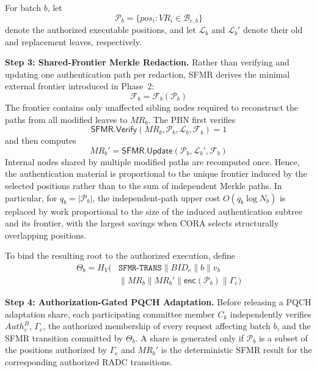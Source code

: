 \documentclass[lettersize,journal]{IEEEtran}
\begin{document}
For batch $b$, let
\begin{equation}
\mathcal{P}_b=
\{pos_i:VR_i\in\mathcal{B}_{e,b}\}
\end{equation}
denote the authorized executable positions, and let
$\mathcal{L}_b$ and $\mathcal{L}_b'$ denote their old and replacement
leaves, respectively.

\medskip
\noindent\textbf{Step 3: Shared-Frontier Merkle Redaction.}
Rather than verifying and updating one authentication path per
redaction, SFMR derives the minimal external frontier introduced in
Phase~2:
\begin{equation}
\mathcal{F}_b
=
\mathcal{F}_b(\mathcal{P}_b)
\end{equation}
The frontier contains only unaffected sibling nodes required to
reconstruct the paths from all modified leaves to $MR_b$. The PBN first
verifies
\begin{equation}
\mathsf{SFMR.Verify}
(MR_b,\mathcal{P}_b,\mathcal{L}_b,\mathcal{F}_b)=1
\end{equation}
and then computes
\begin{equation}
MR_b'
=
\mathsf{SFMR.Update}
(\mathcal{P}_b,\mathcal{L}_b',
\mathcal{F}_b)
\end{equation}
Internal nodes shared by multiple modified paths are recomputed once.
Hence, the authentication material is proportional to the unique
frontier induced by the selected positions rather than to the sum of
independent Merkle paths. In particular, for $q_b=|\mathcal{P}_b|$,
the independent-path upper cost $O(q_b\log N_b)$ is replaced by work
proportional to the size of the induced authentication subtree and its
frontier, with the largest savings when CORA selects structurally
overlapping positions.

To bind the resulting root to the authorized execution, define
\begin{equation}
\begin{aligned}
\Theta_b
=
H_V\big(&\texttt{SFMR-TRANS}\parallel BID_e\parallel b
\parallel v_b\\
&\parallel MR_b\parallel MR_b'
\parallel \mathsf{enc}(\mathcal{P}_b)
\parallel \Gamma_e\big)
\end{aligned}
\label{eq:theta}
\end{equation}

\medskip
\noindent\textbf{Step 4: Authorization-Gated PQCH Adaptation.}
Before releasing a PQCH adaptation share, each participating committee
member $C_k$ independently verifies $Auth_e^B$, $\Gamma_e$, the
authorized membership of every request affecting batch $b$, and the
SFMR transition committed by $\Theta_b$. A share is generated only if
$\mathcal{P}_b$ is a subset of the positions authorized by
$\Gamma_e$ and $MR_b'$ is the deterministic SFMR result for the
corresponding authorized RADC transitions.
\end{document}
